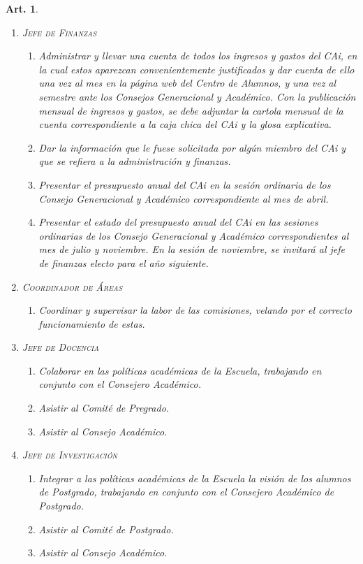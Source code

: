 \documentclass[letterpaper,11pt]{article}
\theoremstyle{plain}
\newtheorem{art}{Art.} %
\begin{document}
\begin{art}
\begin{enumerate}
				\item \textsc{Jefe de Finanzas}
					\begin{enumerate}
						\item Administrar y llevar una cuenta de todos los ingresos y gastos del CAi, en la cual estos aparezcan convenientemente justificados y dar cuenta de ello una vez al mes en la página web del Centro de Alumnos, y una vez al semestre ante los Consejos Generacional y Académico. Con la publicación mensual de ingresos y gastos, se debe adjuntar la cartola mensual de la cuenta correspondiente a la caja chica del CAi y la glosa explicativa.
						
						\item Dar la información que le fuese solicitada por algún miembro del CAi y que se refiera a la administración y finanzas.
						
						\item Presentar el presupuesto anual del CAi en la sesión ordinaria de los  Consejo Generacional y Académico correspondiente al mes de abril.
						
						\item Presentar el estado del presupuesto anual del CAi en las sesiones ordinarias de los Consejo Generacional y Académico correspondientes al mes de julio y noviembre. En la sesión de noviembre, se invitará al jefe de finanzas electo para el año siguiente.
					\end{enumerate}

				\item \textsc{Coordinador de Áreas}
					\begin{enumerate}
						\item Coordinar y supervisar la labor de las comisiones, velando por el correcto funcionamiento de estas.
					\end{enumerate}

				\item \textsc{Jefe de Docencia}
					\begin{enumerate}
						\item Colaborar en las políticas académicas de la Escuela, trabajando en conjunto con el Consejero Académico.
						
						\item Asistir al Comité de Pregrado.
						
						\item Asistir al Consejo Académico.
					\end{enumerate}

				\item \textsc{Jefe de Investigación}
					\begin{enumerate}
						\item Integrar a las políticas académicas de la Escuela la visión de los alumnos de Postgrado, trabajando en conjunto con el Consejero Académico de Postgrado.
						\item Asistir al Comité de Postgrado.
						\item Asistir al Consejo Académico.
					\end{enumerate}
					

\end{enumerate}
\end{art}
\end{document}
